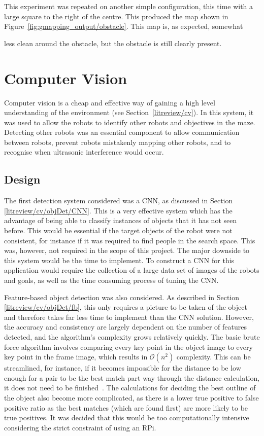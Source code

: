 This experiment was repeated on another simple configuration, this time with a large square to the right of the
centre. This produced the map shown in Figure~\ref{fig:gmapping_output/obstacle}. This map is, as expected, somewhat

less clean around the obstacle, but the obstacle is still clearly present. 

\section{Computer Vision}\label{soft/cv}
Computer vision is a cheap and effective way of gaining a high level
understanding of the environment (see Section~\ref{litreview/cv}). In this system, it was used to allow the robots to
identify other robots and objectives in the maze. Detecting other
robots was an essential component to allow communication between robots,
prevent robots mistakenly mapping other robots, and to recognise when
ultrasonic interference would occur.

\subsection{Design}\label{soft/cv/design}
The first detection system considered was a CNN, as discussed in Section
\ref{litreview/cv/objDet/CNN}. This is a very effective system which has
the advantage of
being able to classify instances of objects that it has not
seen before. This would be essential if the target objects of
the robot were not consistent, for instance if it was required to find
people in the search space. This was, however, not required
in the scope of this project. The major downside to this
system would be the time to implement. To construct a CNN for
this application would require the collection of a large data
set of images of the robots and goals, as well as the time
consuming process of tuning the CNN.

Feature-based object detection was also considered. As described in
Section \ref{litreview/cv/objDet/fb}, this only requires a picture to be
taken of the object and therefore takes far less time to
implement than the CNN solution. However, the accuracy and
consistency are largely dependent on the number of features
detected, and the algorithm's complexity grows relatively
quickly. The basic brute force algorithm involves comparing
every key point in the object image to every key point in the
frame image, which results in $\mathcal{O}(n^2)$ complexity. This can be streamlined, for instance, if it becomes impossible
for the distance to be low enough for a pair to be the best
match part way through the distance calculation, it does not
need to be finished~\cite{opencv_library}. The calculations for deciding the best
outline of the object also become more complicated, as there
is a lower true positive to false positive ratio as the
best matches (which are found first) are more likely to be
true positives. It was decided that this would be too
computationally intensive considering the strict constraint of
using an RPi.

